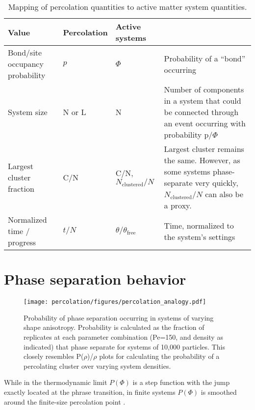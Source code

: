 \begin{table*}[t]
\begin{center}
\begin{tabular}{ >{\raggedright}m{} >{\centering}m{} >{\centering}m{} >{\raggedright\arraybackslash}m{}}
\hline
\textbf{Value} & \textbf{Percolation} & \textbf{Active systems} & \\ \hline
Bond/site occupancy probability & $p$ & $\Phi$ & Probability of a ``bond'' occurring \\ \hline
System size & N or L & N & Number of components in a system that could be connected through an event occurring with probability p/$\Phi$ \\ \hline
Largest cluster fraction & C/N & C/N, $N_\text{clustered}/N$ & Largest cluster remains the same. However, as some systems phase-separate very quickly, $N_\text{clustered}/N$ can also be a proxy. \\ \hline
Normalized time / progress & $t/N$ & $\theta/\theta_\text{free}$ & Time, normalized to the system's settings \\
\hline
\end{tabular}
\caption{Mapping of percolation quantities to active matter system quantities.}
\label{tab:mapping}
\end{center}
\end{table*}

\section{Phase separation behavior}

\begin{figure}
\centering
\texttt{[image: percolation/figures/percolation\_analogy.pdf]}
\caption{Probability of phase separation occurring in systems of varying shape anisotropy. Probability is calculated as the fraction of replicates at each parameter combination (Pe=150, and density as indicated) that phase separate for systems of 10,000 particles. This closely resembles P($\rho$)/$\rho$ plots for calculating the probability of a percolating cluster over varying system densities.}
\label{fig:cluster_percolation}
\end{figure}

While in the thermodynamic limit $P(\Phi)$ is a step function with the jump exactly located at the phrase transition, in finite systems $P(\Phi)$ is smoothed around the finite-size percolation point \cite{percolation_book}.

